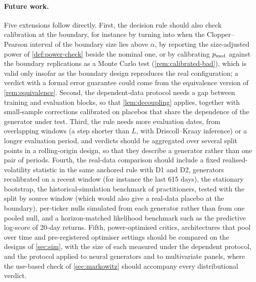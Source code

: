 \paragraph{Future work.}
Five extensions follow directly. First, the decision rule should also check calibration at the
boundary, for instance by turning \BAD{} into \INCONCL{} when the Clopper--Pearson interval of the
boundary size lies above $\alpha$, by reporting the size-adjusted power of \cref{def:power-check}
beside the nominal one, or by calibrating $p_{\mathrm{med}}$ against the boundary replications as a Monte
Carlo test (\cref{rem:calibrated-bad}), which is valid only insofar as the boundary design
reproduces the real configuration; a \GOOD{} verdict with a formal error guarantee could come from the
equivalence version of \cref{rem:equivalence}. Second, the dependent-data protocol needs a gap
between training and evaluation blocks, so that \cref{lem:decoupling} applies, together with
small-sample corrections calibrated on placebos that share the dependence of the generator under
test. Third, the rule needs more evaluation dates, from overlapping windows (a step shorter than
$L$, with Driscoll--Kraay inference) or a longer evaluation period, and verdicts should be
aggregated over several split points in a rolling-origin design, so that they describe a
generator rather than one pair of periods. Fourth, the real-data comparison should include a
fixed realised-volatility statistic in the same anchored rule with D1 and D2, generators
recalibrated on a recent window (for instance the last 615 \TRAIN{} days), the stationary
bootstrap, the historical-simulation benchmark of practitioners, tested with the split by source
window (which would also give a real-data placebo at the boundary), per-ticker nulls simulated
from each generator rather than from one pooled \GARCHt{} null, and a horizon-matched likelihood
benchmark such as the predictive log-score of 20-day returns. Fifth, power-optimised critics, architectures that pool over time and
pre-registered optimiser settings should be compared on the designs of \cref{sec:sim}, with the
size of each measured under the dependent protocol, and the protocol applied to neural generators
and to multivariate panels, where the use-based check of \cref{sec:markowitz} should accompany
every distributional verdict.
